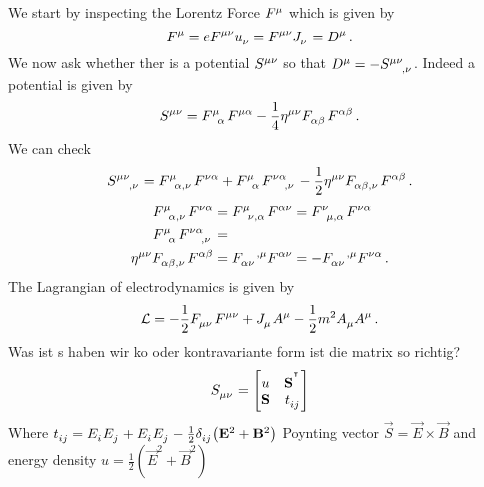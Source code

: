 \begin{example}[Electrodynamics]
We start by inspecting the Lorentz Force $\tensor{F}{^\mu}$ which is given by
\begin{equation}
\tensor{F}{^\mu}=e\tensor{F}{^\mu^\nu}\tensor{u}{_\nu}=\tensor{F}{^\mu^\nu}\tensor{J}{_\nu}=\tensor{D}{^\mu}\,
.
\end{equation}
We now ask whether ther is a potential $\tensor{S}{^\mu^\nu}$ so that
$\tensor{D}{^\mu}=-\tensor{S}{^\mu^\nu_{,\nu}}$. Indeed a potential is given by 
\begin{equation}
\tensor{S}{^\mu^\nu}=\tensor{F}{^\mu_\alpha}\tensor{F}{^\mu^\alpha}-\frac{1}{4}\tensor{\eta}{^\mu^\nu}\tensor{F}{_\alpha_\beta}\tensor{F}{^\alpha^\beta}\,
.
\end{equation}
We can check 
\begin{equation}
\tensor{S}{^\mu^\nu_{,\nu}}=\tensor{F}{^\mu_\alpha_{,\nu}}\tensor{F}{^\nu^\alpha}+
\tensor{F}{^\mu_\alpha}\tensor{F}{^\nu^\alpha_{,\nu}}
-\frac{1}{2}\tensor{\eta}{^\mu^\nu}\tensor{F}{_\alpha_\beta_{,\nu}}\tensor{F}{^\alpha^\beta}\,
.
\end{equation}
\begin{align}
\tensor{F}{^\mu_\alpha_{,\nu}}\tensor{F}{^\nu^\alpha}
&=\tensor{F}{^\mu_\nu_{,\alpha}}\tensor{F}{^\alpha^\nu}
=\tensor{F}{^\nu_\mu_{,\alpha}}\tensor{F}{^\nu^\alpha}
\\
\tensor{F}{^\mu_\alpha}\tensor{F}{^\nu^\alpha_{,\nu}}&=\\
\tensor{\eta}{^\mu^\nu}\tensor{F}{_\alpha_\beta_{,\nu}}\tensor{F}{^\alpha^\beta}
&=\tensor{F}{_\alpha_\nu^{,\mu}}\tensor{F}{^\alpha^\nu}
= -\tensor{F}{_\alpha_\nu^{,\mu}}\tensor{F}{^\nu^\alpha}
\,
.
\end{align}
The Lagrangian of electrodynamics is given by
\begin{equation}
\mathcal{L}=-\frac{1}{2}\tensor{F}{_\mu_\nu}\tensor{F}{^\mu^\nu}+\tensor{J}{_\mu}\tensor{A}{^\mu}-\frac{1}{2}m^2\tensor{A}{_\mu}\tensor{A}{^\mu}\,
.
\end{equation}
Was ist s haben wir ko oder kontravariante form ist die matrix so richtig?
\begin{equation}
\tensor{S}{_\mu_\nu}=
\begin{bmatrix}
u&\vec{S}^{\transpose}\\
\vec{S}& \tensor{t}{_i_j}
\end{bmatrix}
\end{equation}
Where
$\tensor{t}{_i_j}=\tensor{E}{_i}\tensor{E}{_j}+\tensor{E}{_i}\tensor{E}{_j}-\frac{1}{2}\tensor{\delta}{_i_j}\left(\vec{E}^2+\vec{B}^2\right)$
Poynting vector $\vec{S}=\vec{E}\times\vec{B}$ and energy density $u
=\frac{1}{2}\left(\vec{E}^2+\vec{B}^2\right)$
\end{example}
